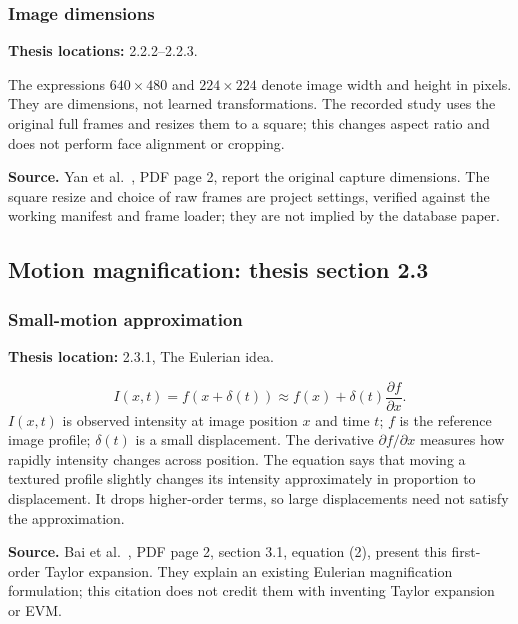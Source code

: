 \documentclass[11pt,a4paper]{article}
\numberwithin{equation}{section}
\begin{document}
\subsubsection{Image dimensions}
\label{fg:geometry}
\textbf{Thesis locations:} 2.2.2--2.2.3.

The expressions $640\times480$ and $224\times224$ denote image width and height
in pixels. They are dimensions, not learned transformations. The recorded study
uses the original full frames and resizes them to a square; this changes aspect
ratio and does not perform face alignment or cropping.

\textbf{Source.} Yan et al.~\cite{yan2014}, PDF page 2, report the original
capture dimensions. The square resize and choice of raw frames are project
settings, verified against the working manifest and frame loader; they are not
implied by the database paper.

\subsection{Motion magnification: thesis section 2.3}

\subsubsection{Small-motion approximation}
\label{fg:evm}
\textbf{Thesis location:} 2.3.1, The Eulerian idea.

\begin{equation}
    I(x,t)=f(x+\delta(t))
       \approx f(x)+\delta(t)\frac{\partial f}{\partial x}.
    \label{fg:eq:evm-taylor}
\end{equation}
$I(x,t)$ is observed intensity at image position $x$ and time $t$; $f$ is the
reference image profile; $\delta(t)$ is a small displacement. The derivative
$\partial f/\partial x$ measures how rapidly intensity changes across position.
The equation says that moving a textured profile slightly changes its intensity
approximately in proportion to displacement. It drops higher-order terms, so
large displacements need not satisfy the approximation.

\textbf{Source.} Bai et al.~\cite{bai2021}, PDF page 2, section 3.1,
equation (2), present this first-order Taylor expansion. They explain an existing
Eulerian magnification formulation; this citation does not credit them with
inventing Taylor expansion or EVM.
\end{document}
